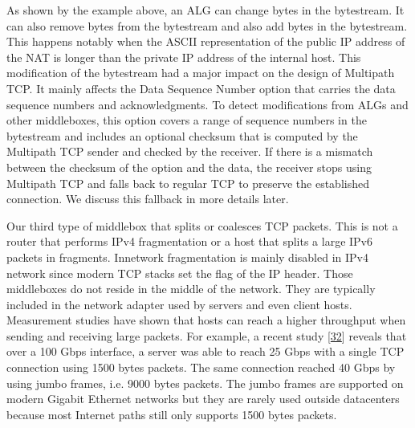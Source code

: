 \documentclass[letterpaper,10pt,english]{sphinxmanual}
\begin{document}
\sphinxAtStartPar
As shown by the example above, an ALG can change bytes in the bytestream. It can also remove bytes from the bytestream and also add bytes in the bytestream. This happens notably when the ASCII representation of the public IP address of the NAT is longer than the private IP address of the internal host. This modification of the bytestream had a major impact on the design of Multipath TCP. It mainly affects the Data Sequence Number option that carries the data sequence numbers and acknowledgments. To detect modifications from ALGs and other middleboxes, this option covers a range of sequence numbers in the bytestream and includes an optional checksum that is computed by the Multipath TCP sender and checked by the receiver. If there is a mismatch between the checksum of the option and the data, the receiver stops using Multipath TCP and falls back to regular TCP to preserve the established connection. We discuss this fallback in more details later.

\sphinxAtStartPar
Our third type of middlebox that splits or coalesces TCP packets. This is not a router that performs IPv4 fragmentation or a host that splits a large IPv6 packets in fragments. In\sphinxhyphen{}network fragmentation is mainly disabled in IPv4 network since modern TCP stacks set the  flag of the IP header. Those middleboxes do not reside in the middle of the network. They are typically included in the network adapter used by servers and even client hosts. Measurement studies have shown that hosts can reach a higher throughput when sending and receiving large packets. For example, a recent study {[}\hyperlink{cite.biblio:id8923}{32}{]} reveals that over a 100 Gbps interface, a server was able to reach 25 Gbps with a single TCP connection using 1500 bytes packets. The same connection reached 40 Gbps by using jumbo frames, i.e. 9000 bytes packets. The jumbo frames are supported on modern Gigabit Ethernet networks but they are rarely used outside datacenters because most Internet paths still only supports 1500 bytes packets.
\end{document}
